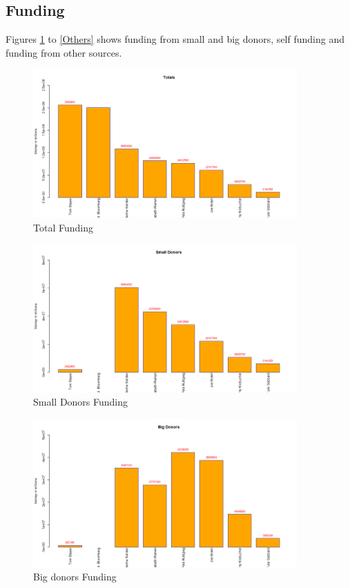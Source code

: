\subsection{Funding}

Figures \ref{Total} to \ref{Others} shows funding from small and big donors,  self funding and funding from other sources.

\begin{figure}[H]
    \centering
    \includegraphics[width=0.9\textwidth]{figures/Total.png}
    \caption{Total Funding}
    \label{Total}
\end{figure}

\begin{figure}[H]
    \centering
    \includegraphics[width=0.9\textwidth]{figures/Small Donors.png}
    \caption{Small Donors Funding}
    \label{Small Donors}
\end{figure}

\begin{figure}[H]
    \centering
    \includegraphics[width=0.9\textwidth]{figures/Bigdonor.png}
    \caption{Big donors Funding}
    \label{Bigdonor}
\end{figure}

